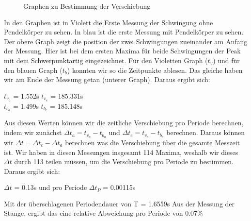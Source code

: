 \documentclass[twoside]{protokoll}
\begin{document}
\begin{figure}[H]
    \centering
    \hfill
    \caption{Graphen zu Bestimmung der Verschiebung}
    \end{figure}

In den Graphen ist in Violett die Erste Messung der Schwingung ohne Pendelkörper zu sehen.
In blau ist die erste Messung mit Pendelkörper zu sehen. 
Der obere Graph zeigt die position der zwei Schwingungen zueinander am Anfang der Messung. 
Hier ist bei dem ersten Maxima für beide Schwingungen der Peak mit dem Schwerpunktartig eingezeichnet. 
Für den Violetten Graph ($t_v$) und für den blauen Graph ($t_b$) konnten wir so die Zeitpunkte ablesen. 
Das gleiche haben wir am Ende der Messung getan (unterer Graph).
Daraus ergibt sich:
\begin{center}
$t_{v_a}$ = 1.552s \qquad $t_{v_e}$ = 185.331s\\
$t_{b_a}$ = 1.499s \qquad $t_{b_e}$ = 185.148s
\end{center}

Aus diesen Werten können wir die zeitliche Verschiebung pro Periode berechnen, indem wir zunächst $ \Delta t_a = t_{v_a}-t_{b_a}$ und $ \Delta t_e = t_{v_e}-t_{b_e}$ berechnen.
Daraus können wir $ \Delta t = \Delta t_e - \Delta t_a $ berechnen was die Verschiebung über die gesamte Messzeit ist.
Wir haben in diesen Messungen insgesamt 114 Maxima, weshalb wir dieses $\Delta t$ durch 113 teilen müssen, um die Verschiebung pro Periode zu bestimmen. 
Daraus ergibt sich:
\begin{center}
$\Delta t $ = 0.13s \qquad und pro Periode \quad $\Delta t_P$ = 0.00115s
\end{center}
Mit der überschlagenen Periodendauer von T = 1.6559s Aus der Messung der Stange, ergibt das eine relative Abweichung pro Periode von 0.07\% 
\end{document}
